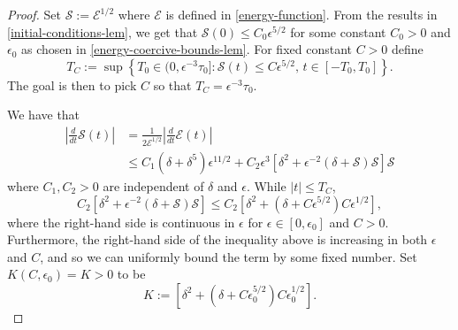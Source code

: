 \begin{proof}
	Set \(\mathcal S := \mathcal E ^{1/2}\) where \(\mathcal E\) is defined in \cref{energy-function}. From the results in \cref{initial-conditions-lem}, we get that \(\mathcal S(0) \leq C_0 \epsilon^{5/2}\) for some constant \(C_0 > 0\) and \(\epsilon_0\) as chosen in \cref{energy-coercive-bounds-lem}. For fixed constant \(C> 0\) define
	\begin{equation}
		T_{C} := \sup \left\{T_0 \in (0,   \epsilon^{-3} \tau_0]: \mathcal S(t) \leq C \epsilon^{5/2},\, t\in [-T_0, T_0]\right\}.
	\end{equation} 
	The goal is then to pick \(C\) so that \(T_{C} = \epsilon^{-3} \tau_0\).
	
	We have that
	\begin{equation}
		\begin{aligned}
			\left | \frac d {dt} \mathcal S(t) \right | &= \frac 1 {2 \mathcal E ^{1/2}} \left | \frac d {dt} \mathcal E(t) \right| \\
			&\leq C_1(\delta + \delta^5) \epsilon^{11/2} + C_2 \epsilon^3\left[ \delta^2 + \epsilon^{-2}(\delta + \mathcal S) \mathcal S \right]\mathcal S
		\end{aligned}
	\end{equation}
	where \(C_1, C_2 > 0\) are independent of \(\delta\) and \(\epsilon\). While \(|t| \leq T_{C}\),
	\begin{equation}
		C_2 \left[ \delta^2 + \epsilon^{-2}(\delta + \mathcal S) \mathcal S \right] \leq C_2 \left[ \delta^2  + (\delta +  C\epsilon^{5/2}) C \epsilon^{1/2} \right],
	\end{equation}
	where the right-hand side is continuous in \(\epsilon \) for \(\epsilon \in [0,\epsilon_0]\) and \(C>0\). Furthermore, the right-hand side of the inequality above is increasing in both \(\epsilon\) and \(C\), and so we can uniformly bound the term by some fixed number. Set \(K(C,\epsilon_0)= K>0\) to be
	\begin{equation}\label{K-def-2}
		K :=  \left[ \delta^2  + (\delta +  C\epsilon_0^{5/2}) C \epsilon_0^{1/2} \right].
	\end{equation}
	

\end{proof}
